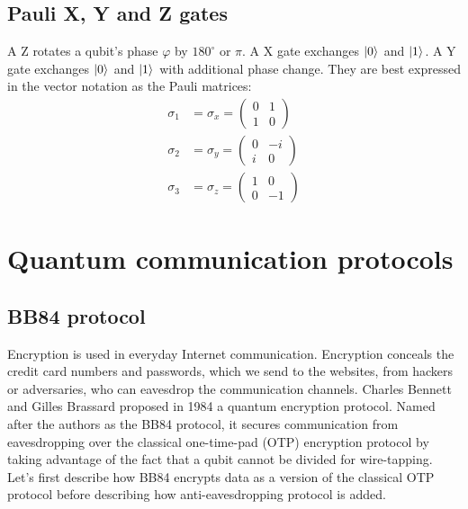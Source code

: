 \documentclass[Letter,11pt]{book}
\begin{document}
\section{Pauli X, Y and Z gates}
A Z rotates a qubit's phase $\varphi$ by $180^{\circ}$ or $\pi$. A X gate exchanges $\vert {0} \rangle_{}$ and $\vert {1} \rangle_{}$. A Y gate exchanges $\vert {0} \rangle_{}$ and $\vert {1} \rangle_{}$ with additional phase change. They are best expressed in the vector notation as the Pauli matrices:
\begin{equation}
\begin{array}{rl}
    \sigma_1 & = \sigma_x = \begin{pmatrix}
        0 & 1 \\
        1 & 0
    \end{pmatrix} \\
    \sigma_2 & = \sigma_y = \begin{pmatrix}
        0 & -i \\
        i & 0
    \end{pmatrix} \\
    \sigma_3 & = \sigma_z = \begin{pmatrix}
        1 & 0 \\
        0 & -1
    \end{pmatrix}
\end{array}
\end{equation}

\chapter{Quantum communication protocols}

\section{BB84 protocol}
Encryption is used in everyday Internet communication. Encryption conceals the credit card numbers and passwords, which we send to the websites, from hackers or adversaries, who can eavesdrop the communication channels. Charles Bennett and Gilles Brassard proposed in 1984 a quantum encryption protocol\cite{BB84}. Named after the authors as the BB84 protocol, it secures communication from eavesdropping over the classical one-time-pad (OTP) encryption protocol\cite{Schneier} by taking advantage of the fact that a qubit cannot be divided for wire-tapping. Let's first describe how BB84 encrypts data as a version of the classical OTP protocol before describing how anti-eavesdropping protocol is added.
\end{document}
